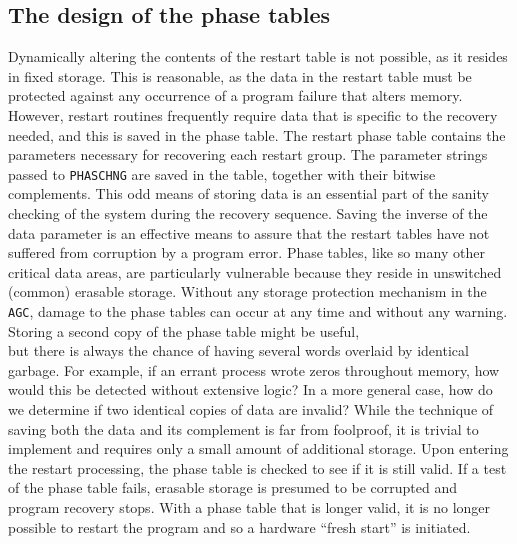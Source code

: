 \documentclass[refcap, oxford]{ahsan}
\begin{document}
\subsection{The design of the phase tables}
Dynamically altering the contents of the restart table is not possible, as it resides in fixed storage. This is reasonable, as the data in the restart table must be protected against any occurrence of a program failure that alters memory. However, restart routines frequently require data that is specific to the recovery needed, and this is saved in the phase table. The restart phase table contains the parameters necessary for recovering each restart group. The parameter strings passed to \texttt{PHASCHNG} are saved in the table, together with their bitwise complements. This odd means of storing data is an essential part of the sanity checking of the system during the recovery sequence. Saving the inverse of the data parameter is an effective means to assure that the restart tables have not suffered from corruption by a program error. Phase tables, like so many other critical data areas, are particularly vulnerable because they reside in unswitched (common) erasable storage. Without any storage protection mechanism in the \texttt{AGC}, damage to the phase tables can occur at any time and without any warning. Storing a second copy of the phase table might be useful,\\
but there is always the chance of having several words overlaid by identical garbage. For example, if an errant process wrote zeros throughout memory, how would this be detected without extensive logic? In a more general case, how do we determine if two identical copies of data are invalid? While the technique of saving both the data and its complement is far from foolproof, it is trivial to implement and requires only a small amount of additional storage. Upon entering the restart processing, the phase table is checked to see if it is still valid. If a test of the phase table fails, erasable storage is presumed to be corrupted and program recovery stops. With a phase table that is longer valid, it is no longer possible to restart the program and so a hardware ``fresh start'' is initiated.
\end{document}
